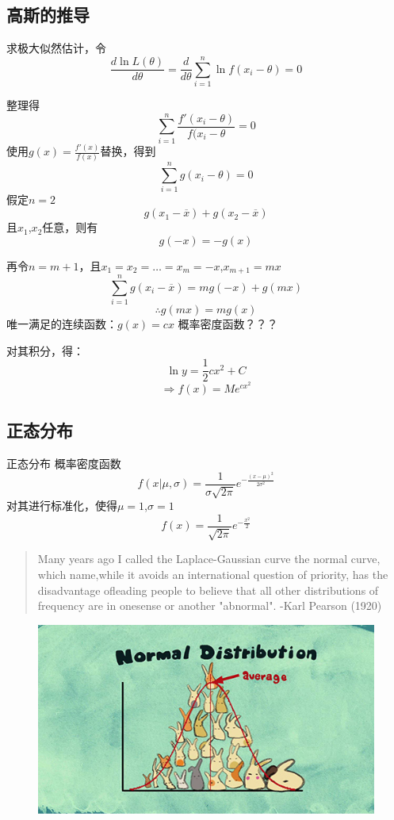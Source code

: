 \documentclass[14pt,hyperref={CJKbookmarks=true}]{beamer}
\begin{document}
\subsection{高斯的推导}
\begin{frame}
求极大似然估计，令
\[\frac{d\ln L(\theta)}{d\theta}=\frac{d}{d\theta}\sum_{i=1}^{n}\ln f(x_i-\theta)=0\]
\end{frame}
\begin{frame}[fragile]
整理得
\[\sum^{n}_{i=1}\frac{f'(x_i-\theta)}{f(x_i-\theta}=0\]
使用$g(x)=\frac{f'(x)}{f(x)}$替换，得到
\[\sum^{n}_{i=1}g(x_i-\theta)=0\]
假定$n=2$
\[g(x_1-\overline{x})+g(x_2-\overline{x})\]
且$x_1$,$x_2$任意，则有
\[g(-x)=-g(x)\]
\end{frame}
\begin{frame}[fragile]
再令$n=m+1$，且$x_1=x_2=\dots=x_m=-x$,$x_{m+1}=mx$
\[\sum^{n}_{i=1}g(x_i-\overline{x})=mg(-x)+g(mx)\]
\[\therefore g(mx)=mg(x)\]
唯一满足的连续函数：$g(x)=cx$ \newline
概率密度函数？？？
\end{frame}
\begin{frame}
对其积分，得：
\[\ln y = \frac{1}{2}cx^{2}+C\]
\[\Rightarrow f(x)=Me^{cx^{2}}\]
\end{frame}
\subsection{正态分布}
\begin{frame}{正态分布}
概率密度函数
\[f(x|\mu,\sigma)=\frac{1}{\sigma\sqrt{2\pi}}e^{-\frac{(x- \mu)^{2}}{2\sigma^{2}}}\]
对其进行标准化，使得$\mu=1$,$\sigma=1$
\[f(x)=\frac{1}{\sqrt{2\pi}}e^{-\frac{x^2}{2}}\]
\end{frame}
\begin{frame}
\begin{quote}
Many years ago I called the Laplace-Gaussian curve the normal curve, which name,while it avoids an international question of priority, has the disadvantage ofleading people to believe that all other distributions of frequency are in onesense or another "abnormal". \newline
-Karl Pearson (1920)
\end{quote}
\end{frame}
\begin{frame}
\begin{figure}
\centering
\includegraphics[scale=0.6]{Rabbits.jpg}
\end{figure}
\end{frame}
\end{document}
